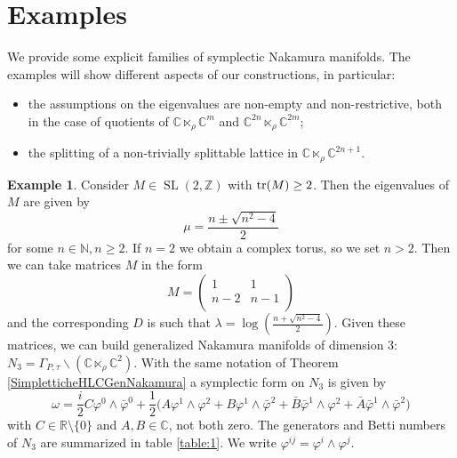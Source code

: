\documentclass[a4paper, 11pt]{amsart}
\theoremstyle{plain}
\theoremstyle{definition}
\newtheorem{esempio}{Example}[section]
\DeclareMathOperator{\SL}{SL}
\newcommand{\C}{\mathbb{C}}
\numberwithin{equation}{section}
\begin{document}
\section{Examples} We provide some explicit families of symplectic Nakamura manifolds. The examples will show different aspects of our constructions, in particular:
\begin{itemize}
    \item the assumptions on the eigenvalues are non-empty and non-restrictive, both in the case of quotients of $\C \ltimes_{\rho} \C^{m}$ and $\C^{2n} \ltimes_{\rho} \C^{2m}$;
    \item the splitting of a non-trivially splittable lattice in $\C \ltimes_{\rho} \C^{2n+1}$.
\end{itemize}

\begin{esempio}\label{ex:1}
    Consider $M \in \SL(2,\mathbb{Z})$ with $\hbox{tr}(M)\geq 2$. Then the eigenvalues of $M$ are given by 
    $$\mu = \dfrac{n \pm \sqrt{n^{2}-4}}{2}$$ 
    for some $n \in \mathbb{N}, n \ge 2$. If $n = 2$ we obtain a complex torus, so we set $n > 2$. Then we can take matrices $M$ in the form
    \[M = \begin{pmatrix}
        1 & 1 \\
        n-2 & n-1 \\
    \end{pmatrix}\]
    and the corresponding $D$ is such that $\lambda = \log(\frac{n + \sqrt{n^{2}-4}}{2})$. Given these matrices, we can build generalized Nakamura manifolds of dimension 3: $N_{3} = \Gamma_{P, \tau} \backslash (\mathbb{C} \ltimes_{\rho} \mathbb{C}^{2})$. With the same notation of Theorem \ref{SimpletticheHLCGenNakamura} a symplectic form on $N_{3}$ is given by
    \[\omega = \frac{i}{2}C\varphi^{0} \wedge \bar\varphi^{0} + \frac{1}{2}\bigl(A\varphi^{1} \wedge \varphi^{2} + B\varphi^{1} \wedge \bar\varphi^{2} + \bar B\bar\varphi^{1} \wedge \varphi^{2} + \bar A\bar\varphi^{1} \wedge \bar\varphi^{2}\bigr)\]
    with $C \in \mathbb{R} \setminus \{0\}$ and $A,B \in \C$, not both zero. The generators and Betti numbers of $N_{3}$ are summarized in table \ref{table:1}. We write $\varphi^{ij} = \varphi^{i} \wedge \varphi^{j}$.
\end{esempio}
\end{document}
